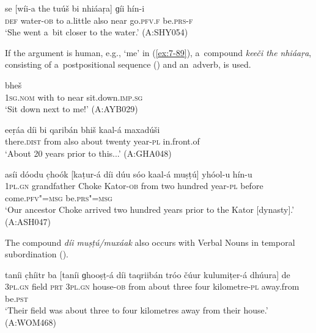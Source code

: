 \begin{exe}
\ex
\label{ex:7-88}
\gll se [wíi-a the tuúš bi nhiáaṛa] ɡíi hín-i \\
\textsc{def} water-\textsc{ob} to a.little also near go.\textsc{pfv.f} be.\textsc{prs-f} \\
\glt `She went a~bit closer to the water.' (A:SHY054)
\end{exe}

If the argument is human, e.g., `me' in (\ref{ex:7-89}), a~compound \textit{keeči the nhiáaṛa}, consisting of a~postpositional sequence () and an~adverb, is used.

\begin{exe}
\ex
\label{ex:7-89}
 bheš \\
\textsc{1sg.nom} with to near sit.down.\textsc{imp.sg} \\
\glt `Sit down next to me!' (A:AYB029)
\end{exe}


\begin{exe}
\ex
\label{ex:7-90}
\gll eeṛáa díi bi qaribán bhiš kaal-á maxadúši \\
there.\textsc{dist} from also about twenty year-\textsc{pl} in.front.of \\
\glt `About 20 years prior to this...' (A:GHA048)
\end{exe}
\begin{exe}
\ex
\label{ex:7-91}
\gll asíi dóodu c̣hoók [kaṭur-á díi dúu sóo kaal-á muṣṭú] yhóol-u
hín-u \\
\textsc{1pl.gn} grandfather Choke Kator-\textsc{ob} from two hundred year-\textsc{pl} before come.\textsc{pfv"=msg} be.\textsc{prs"=msg}  \\
\glt `Our ancestor Choke arrived two hundred years prior to the Kator [dynasty].' (A:ASH047)
\end{exe}

The compound \textit{díi muṣṭú/muxáak} also occurs with Verbal Nouns in temporal subordination (). 



\begin{exe}
\ex
\label{ex:7-92}
\gll taníi c̣híitr ba [taníi ɡhooṣṭ-á díi taqriibán tróo čúur
  kulumiṭer-á dhúura] de \\
\textsc{3pl.gn} field \textsc{prt} \textsc{3pl.gn} house-\textsc{ob} from about three four kilometre-\textsc{pl} away.from be.\textsc{pst}  \\
\glt `Their field was about three to four kilometres away from their house.' (A:WOM468)
\end{exe}

